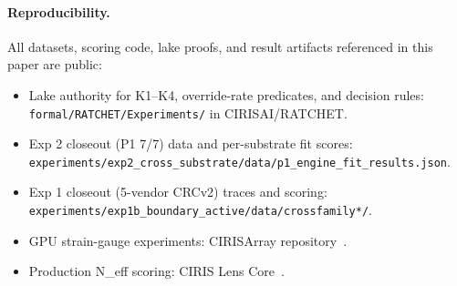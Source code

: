 \documentclass[11pt,a4paper]{article}
\begin{document}
\paragraph{Reproducibility.} All datasets, scoring code, lake proofs, and result artifacts referenced in this paper are public:
\begin{itemize}[leftmargin=*,itemsep=2pt]
  \item Lake authority for K1--K4, override-rate predicates, and decision rules: \texttt{formal/RATCHET/Experiments/} in CIRISAI/RATCHET.
  \item Exp 2 closeout (P1 7/7) data and per-substrate fit scores: \texttt{experiments/exp2\_cross\_substrate/data/p1\_engine\_fit\_results.json}.
  \item Exp 1 closeout (5-vendor CRCv2) traces and scoring: \texttt{experiments/exp1b\_boundary\_active/data/crossfamily*/}.
  \item GPU strain-gauge experiments: CIRISArray repository~\cite{cirisarray_repo}.
  \item Production N\_eff scoring: CIRIS Lens Core~\cite{cirislens_repo}.
\end{itemize}
\end{document}
